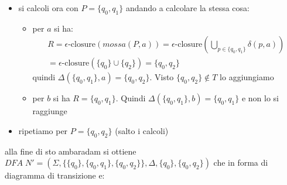 {\begin{itemize}
\begin{itemize}
            Si definisca $\delta(S,a)=\{q_0\}$ e visto che $\{q_0\}\in T$ non lo andiamo a ri-aggiungere
            \item per il carattere $a$ calcoliamo con $P=S=\{q_0\}$:
              \[
                \begin{array}{l}
                    R = \epsilon\text{-closure}(mossa(P,b)) = \epsilon\text{-closure}\left(\bigcup_{p\in\{q_0\}}\delta (p,b)\right) \\                
                    =\epsilon\text{-closure}(\delta(q_0,b)) =\epsilon\text{-closure}(\{q_0, q_1\}) =\{q_0,q_1\}
                \end{array}
              \]
            visto che $\{q_0,q_1\}\notin T$ lo andiamo ad aggiungere
        \end{itemize}
        \item si calcoli ora con $P=\{q_0, q_1\}$ andando a calcolare la stessa cosa:
        \begin{itemize}
            \item per $a$ si ha:
              \[
                \begin{array}{l}
                    R=    \epsilon\text{-closure} (mossa(P,a)) = \epsilon\text{-closure}\left(\bigcup_{p\in\{q_0, q_1\}}\delta(p,a)\right)\\                 
                    = \epsilon\text{-closure} (\{q_0\}\cup\{ q_2\}) = \{q_0,q_2\}
                \end{array}
              \]
            quindi $\Delta(\{q_0,q_1\}, a)=\{q_0,q_2\}$. Visto $\{q_0,q_2\}\notin T$ lo aggiungiamo 
            \item  per $b$ si ha $R=\{q_0,q_1\}$. Quindi $\Delta(\{q_0, q_1\}, b) = \{q_0,q_1\}$ e non lo si raggiunge
        \end{itemize}
        \item ripetiamo per $P=\{q_0, q_2\}$ (salto i calcoli)
    \end{itemize}

    alla fine di sto ambaradam si ottiene $DFA \;N'=(\Sigma, \{\{q_0\},\{q_0,q_1\}, \{q_0,q_2\}\}, \Delta, \{q_0\}, \{q_0,q_2\})$ che in forma di diagramma di transizione e:
    \begin{center}
\end{center}}
